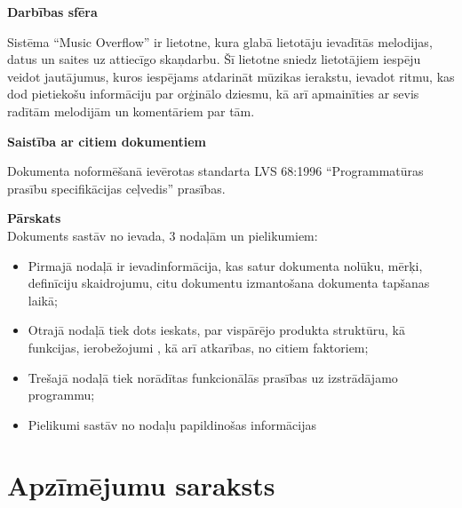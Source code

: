 \documentclass[12pt]{article}
\begin{document}
\textbf{Darbības sfēra}

Sistēma ``Music Overflow'' ir lietotne, kura glabā lietotāju ievadītās melodijas, datus un saites uz attiecīgo skaņdarbu. Šī lietotne sniedz lietotājiem iespēju veidot jautājumus, kuros iespējams atdarināt mūzikas ierakstu, ievadot ritmu, kas dod pietiekošu informāciju par orģinālo dziesmu, kā arī apmainīties ar sevis radītām melodijām un komentāriem par tām.


\textbf{Saistība ar citiem dokumentiem}

Dokumenta noformēšanā ievērotas standarta LVS 68:1996 ``Programmatūras prasību specifikācijas ceļvedis'' prasības.

\textbf{Pārskats}\\
Dokuments sastāv no ievada, 3 nodaļām un pielikumiem:
\begin{itemize}
\item Pirmajā nodaļā ir ievadinformācija, kas satur dokumenta nolūku, mērķi, definīciju skaidrojumu, citu dokumentu izmantošana dokumenta tapšanas laikā;
\item Otrajā nodaļā tiek dots ieskats, par vispārējo produkta struktūru, kā funkcijas, ierobežojumi , kā arī atkarības, no citiem faktoriem;
\item Trešajā nodaļā tiek norādītas funkcionālās prasības uz izstrādājamo programmu;
\item Pielikumi sastāv no nodaļu papildinošas informācijas
\end{itemize}

\pagebreak

\section*{Apzīmējumu saraksts}
\end{document}
